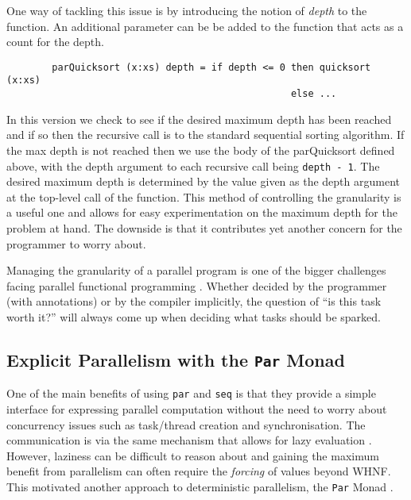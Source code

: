     One way of tackling this issue is by introducing the notion of \emph{depth}
to the function. An additional parameter can be be added to the function that
acts as a count for the depth.

\begin{verbatim}
        parQuicksort (x:xs) depth = if depth <= 0 then quicksort (x:xs)
                                                  else ...
\end{verbatim}

    In this version we check to see if the desired maximum depth has been
reached and if so then the recursive call is to the standard sequential sorting
algorithm. If the max depth is not reached then we use the body of the
parQuicksort defined above, with the depth argument to each recursive call being
\verb=depth - 1=. The desired maximum depth is determined by the value given as
the depth argument at the top-level call of the function. This method of
controlling the granularity is a useful one and allows for easy experimentation
on the maximum depth for the problem at hand. The downside is that it
contributes yet another concern for the programmer to worry about.


Managing the granularity of a parallel program is one of the bigger challenges
facing parallel functional programming \citep{SPJ:PIFPL}. Whether decided by
the programmer (with annotations) or by the compiler implicitly, the question
of ``is this task worth it?'' will always come up when deciding what tasks
should be sparked.


\subsection{Explicit Parallelism with the \texttt{Par} Monad}

One of the main benefits of using \verb|par| and \verb|seq| is that they
provide a simple interface for expressing parallel computation without
the need to worry about concurrency issues such as task/thread creation
and synchronisation. The communication is via the same mechanism that
allows for lazy evaluation \citep{SPF:PIFPL}. However, laziness can
be difficult to reason about and gaining the maximum benefit from parallelism
can often require the \emph{forcing} of values beyond WHNF. 
This motivated another approach to deterministic parallelism, the \verb|Par|
Monad \citep{marlow2011monad}.

